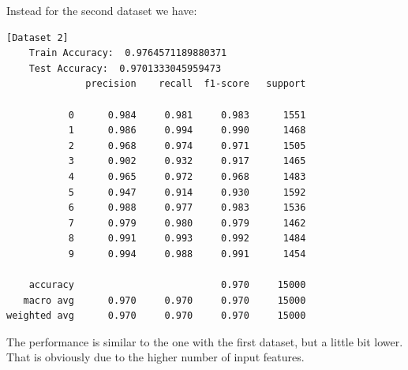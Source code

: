 \documentclass[12pt,a4paper,oneside]{article}
\begin{document}
Instead for the second dataset we have:

\begin{verbatim}[Dataset 2]
    Train Accuracy:  0.9764571189880371
    Test Accuracy:  0.9701333045959473
              precision    recall  f1-score   support

           0      0.984     0.981     0.983      1551
           1      0.986     0.994     0.990      1468
           2      0.968     0.974     0.971      1505
           3      0.902     0.932     0.917      1465
           4      0.965     0.972     0.968      1483
           5      0.947     0.914     0.930      1592
           6      0.988     0.977     0.983      1536
           7      0.979     0.980     0.979      1462
           8      0.991     0.993     0.992      1484
           9      0.994     0.988     0.991      1454

    accuracy                          0.970     15000
   macro avg      0.970     0.970     0.970     15000
weighted avg      0.970     0.970     0.970     15000
\end{verbatim}

The performance is similar to the one with the first dataset, but a little bit
lower. That is obviously due to the higher number of input features.







\nocite{*}  %
\end{document}
